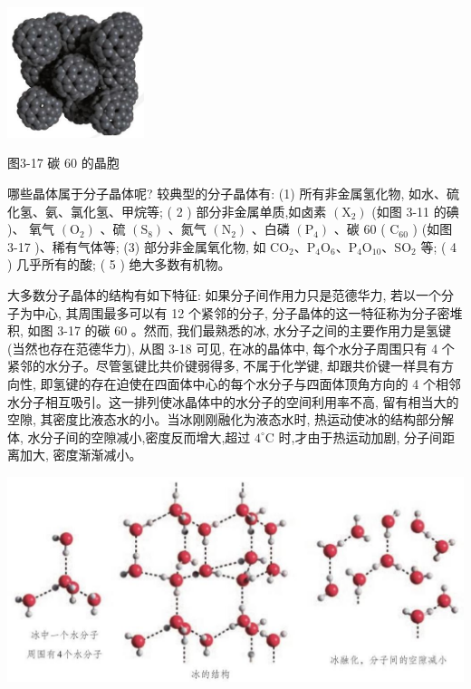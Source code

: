\documentclass[10pt]{article}
\begin{document}
\begin{center}
\includegraphics[max width=0.3\textwidth]{images/0190e026-5a11-7df7-bd27-54d09026ba7a_81_267169.jpg}
\end{center}

图3-17 碳 60 的晶胞

哪些晶体属于分子晶体呢? 较典型的分子晶体有: (1) 所有非金属氢化物, 如水、硫化氢、氨、氯化氢、甲烷等; ( 2 ) 部分非金属单质,如卤素 \(\left( {\mathrm{X}}_{2}\right)\) (如图 3-11 的碘 )、 氧气 \(\left( {\mathrm{O}}_{2}\right)\) 、硫 \(\left( {\mathrm{S}}_{8}\right)\) 、氮气 \(\left( {\mathrm{N}}_{2}\right)\) 、白磷 \(\left( {\mathrm{P}}_{4}\right)\) 、碳 60 ( \({\mathrm{C}}_{60}\) ) (如图 3-17 )、稀有气体等; (3) 部分非金属氧化物, 如 \({\mathrm{{CO}}}_{2}\text{、}{\mathrm{P}}_{4}{\mathrm{O}}_{6}\text{、}{\mathrm{P}}_{4}{\mathrm{O}}_{10}\text{、}{\mathrm{{SO}}}_{2}\) 等; ( 4 ) 几乎所有的酸; ( 5 ) 绝大多数有机物。

大多数分子晶体的结构有如下特征: 如果分子间作用力只是范德华力, 若以一个分子为中心, 其周围最多可以有 12 个紧邻的分子, 分子晶体的这一特征称为分子密堆积, 如图 3-17 的碳 60 。然而, 我们最熟悉的冰, 水分子之间的主要作用力是氢键 (当然也存在范德华力), 从图 3-18 可见, 在冰的晶体中, 每个水分子周围只有 4 个紧邻的水分子。尽管氢键比共价键弱得多, 不属于化学键, 却跟共价键一样具有方向性, 即氢键的存在迫使在四面体中心的每个水分子与四面体顶角方向的 4 个相邻水分子相互吸引。这一排列使冰晶体中的水分子的空间利用率不高, 留有相当大的空隙, 其密度比液态水的小。当冰刚刚融化为液态水时, 热运动使冰的结构部分解体, 水分子间的空隙减小,密度反而增大,超过 \({4}^{ \circ }\mathrm{C}\) 时,才由于热运动加剧, 分子间距离加大, 密度渐渐减小。

\begin{center}
\includegraphics[max width=1.0\textwidth]{images/0190e026-5a11-7df7-bd27-54d09026ba7a_82_587111.jpg}
\end{center}
\end{document}
